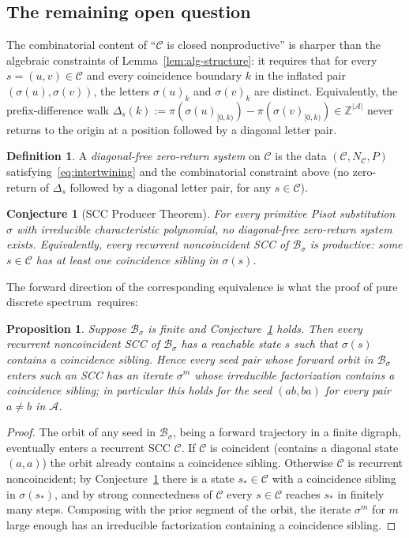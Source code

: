 \documentclass[11pt]{article}
\theoremstyle{plain}
\newtheorem{proposition}[theorem]{Proposition}
\newtheorem{conjecture}[theorem]{Conjecture}
\theoremstyle{definition}
\newtheorem{definition}[theorem]{Definition}
\theoremstyle{remark}
\newcommand{\PDS}{pure discrete spectrum}
\newcommand{\Z}{\mathbb{Z}}
\newcommand{\A}{\mathcal{A}}
\newcommand{\B}{\mathcal{B}}
\newcommand{\C}{\mathcal{C}}
\begin{document}
\subsection{The remaining open question}

The combinatorial content of ``$\C$ is closed nonproductive'' is sharper than the algebraic constraints of Lemma~\ref{lem:alg-structure}: it requires that for every $s=(u,v)\in\C$ and every coincidence boundary $k$ in the inflated pair $(\sigma(u),\sigma(v))$, the letters $\sigma(u)_k$ and $\sigma(v)_k$ are distinct. Equivalently, the prefix-difference walk $\Delta_s(k):=\pi(\sigma(u)_{[0,k)})-\pi(\sigma(v)_{[0,k)})\in\Z^{|\A|}$ never returns to the origin at a position followed by a diagonal letter pair.

\begin{definition}\label{def:diag-free-system}
A \emph{diagonal-free zero-return system} on $\C$ is the data $(\C,N_\C,P)$ satisfying~\eqref{eq:intertwining} and the combinatorial constraint above (no zero-return of $\Delta_s$ followed by a diagonal letter pair, for any $s\in\C$).
\end{definition}

\begin{conjecture}[SCC Producer Theorem]\label{conj:producer}
For every primitive Pisot substitution $\sigma$ with irreducible characteristic polynomial, no diagonal-free zero-return system exists. Equivalently, every recurrent noncoincident SCC of $\B_\sigma$ is productive: some $s\in\C$ has at least one coincidence sibling in $\sigma(s)$.
\end{conjecture}

The forward direction of the corresponding equivalence is what the proof of \PDS\ requires:

\begin{proposition}\label{prop:bpa-coincidence}
Suppose $\B_\sigma$ is finite and Conjecture~\ref{conj:producer} holds. Then every recurrent noncoincident SCC of $\B_\sigma$ has a reachable state $s$ such that $\sigma(s)$ contains a coincidence sibling. Hence every seed pair whose forward orbit in $\B_\sigma$ enters such an SCC has an iterate $\sigma^m$ whose irreducible factorization contains a coincidence sibling; in particular this holds for the seed $(ab,ba)$ for every pair $a\ne b$ in $\A$.
\end{proposition}

\begin{proof}
The orbit of any seed in $\B_\sigma$, being a forward trajectory in a finite digraph, eventually enters a recurrent SCC $\C$. If $\C$ is coincident (contains a diagonal state $(a,a)$) the orbit already contains a coincidence sibling. Otherwise $\C$ is recurrent noncoincident; by Conjecture~\ref{conj:producer} there is a state $s_*\in\C$ with a coincidence sibling in $\sigma(s_*)$, and by strong connectedness of $\C$ every $s\in\C$ reaches $s_*$ in finitely many steps. Composing with the prior segment of the orbit, the iterate $\sigma^m$ for $m$ large enough has an irreducible factorization containing a coincidence sibling.
\end{proof}
\end{document}
